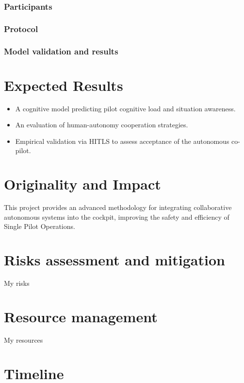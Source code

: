 \documentclass[12pt,a4paper]{article} %
\begin{document}
	\subsubsection{Participants}
	\subsubsection{Protocol}
	\subsubsection{Model validation and results}
	
	\section{Expected Results} %
	\begin{itemize}
		\item A cognitive model predicting pilot cognitive load and situation awareness.
		\item An evaluation of human-autonomy cooperation strategies.
		\item Empirical validation via HITLS to assess acceptance of the autonomous co-pilot.
	\end{itemize} %
	
	\section{Originality and Impact} %
	This project provides an advanced methodology for integrating collaborative autonomous systems into the cockpit, improving the safety and efficiency of Single Pilot Operations.
	
	\section{Risks assessment and mitigation}
	My risks
	
	\section{Resource management}
	My resources
	
	\section{Timeline}
	\printbibliography %
	
\end{document}

